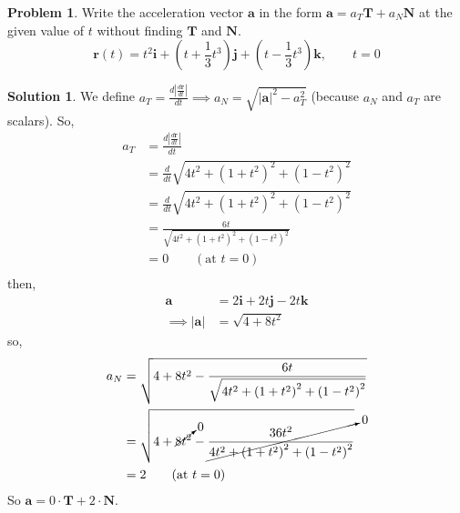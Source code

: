 \documentclass[10pt]{article}
\theoremstyle{definition}
\newtheorem{problem}{Problem}
\newtheorem{soln}{Solution}
\newcommand{\ui}{\mathbf{i}}
\newcommand{\uj}{\mathbf{j}}
\newcommand{\uk}{\mathbf{k}}
\begin{document}
\begin{problem}
Write the acceleration vector $\mathbf{a}$ in the form $\mathbf{a} = a_T \mathbf{T} + a_N \mathbf{N}$ at the given value of $t$ without finding $\mathbf{T}$ and $\mathbf{N}$.
$$\mathbf{r}(t)=t^2\ui+\left(t+\frac{1}{3}t^3\right)\uj+\left(t-\frac{1}{3}t^3 \right)\uk,\qquad t=0$$
\end{problem}
\begin{soln}
  We define $\displaystyle a_T=\frac{d\left|\frac{d\mathbf{r}}{dt}\right|}{dt}\implies a_N=\sqrt{\left|\mathbf{a}\right|^2-a_T^2}$ (because $a_N$ and $a_T$ are scalars). So,
  \begin{align*}
    a_T & =\frac{d\left|\frac{d\mathbf{r}}{dt}\right|}{dt}                   \\
        & =\frac{d}{dt}\sqrt{4t^2+\left(1+t^2\right)^2+\left(1-t^2\right)^2} \\
        & =\frac{d}{dt}\sqrt{4t^2+\left(1+t^2\right)^2+\left(1-t^2\right)^2} \\
        & =\frac{6t}{\sqrt{4t^2+\left(1+t^2\right)^2+\left(1-t^2\right)^2}}  \\
        & =0\qquad (\text{at } t=0)                                          \\
  \end{align*}
  then,
  \begin{align*}
    \mathbf{a}                       & =2\ui+2t\uj-2t\uk \\
    \implies \left|\mathbf{a}\right| & =\sqrt{4+8t^2}
  \end{align*}
  so,
  \begin{align*}
    a_N & =\sqrt{4+8t^2-\frac{6t}{\sqrt{4t^2+\left(1+t^2\right)^2+\left(1-t^2\right)^2}}}                         \\
        & =\sqrt{4+\cancelto{0}{8t^2}-\cancelto{0}{\frac{36t^2}{4t^2+\left(1+t^2\right)^2+\left(1-t^2\right)^2}}} \\
        & =2\qquad (\text{at } t=0)
  \end{align*}
  So $\mathbf{a} = 0\cdot\mathbf{T} + 2\cdot\mathbf{N}$.
\end{soln}
\end{document}
